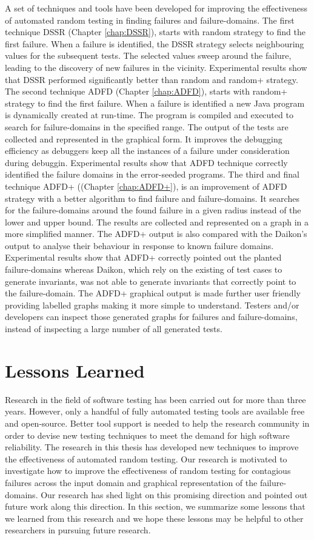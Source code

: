 A set of techniques and tools have been developed for improving the effectiveness of automated random testing in finding failures and failure-domains. The first technique DSSR (Chapter \ref{chap:DSSR}), starts with random strategy to find the first failure. When a failure is identified, the DSSR strategy selects neighbouring values for the subsequent tests. The selected values sweep around the failure, leading to the discovery of new failures in the vicinity. Experimental results show that DSSR performed significantly better than random and random+ strategy. The second technique ADFD (Chapter \ref{chap:ADFD}), starts with random+ strategy to find the first failure. When a failure is identified a new Java program is dynamically created at run-time. The program is compiled and executed to search for failure-domains in the specified range. The output of the tests are collected and represented in the graphical form. It improves the debugging efficiency as debuggers keep all the instances of a failure under consideration during debuggin. Experimental results show that ADFD technique correctly identified the failure domains in the error-seeded programs. The third and final technique ADFD+ ((Chapter \ref{chap:ADFD+}), is an improvement of ADFD strategy with a better algorithm to find failure and failure-domains. It searches for the failure-domains around the found failure in a given radius instead of the lower and upper bound. The results are collected and  represented on a graph in a more simplified manner. The ADFD+ output is also compared with the Daikon's output to analyse their behaviour in response to known failure domains. Experimental results show that ADFD+ correctly pointed out the planted failure-domains whereas Daikon, which rely on the existing of test cases to generate invariants, was not able to generate invariants that correctly point to the failure-domain. The ADFD+ graphical output is made further user friendly providing labelled graphs making it more simple to understand. Testers and/or developers can inspect those generated graphs for failures and failure-domains, instead of inspecting a large number of all generated tests. 

\section{Lessons Learned}
Research in the field of software testing has been carried out for more than three years. However, only a handful of fully automated testing tools are available free and open-source. Better tool support is needed to help the research community in order to devise new testing techniques to meet the demand for high software reliability. The research in this thesis has developed new techniques to improve the effectiveness of automated random testing. Our research is motivated to investigate how to improve the effectiveness of random testing for contagious failures across the input domain and graphical representation of the failure-domains. Our research has shed light on this promising direction and pointed out future work along this direction. In this section, we summarize some lessons that we learned from this research and we hope these lessons may be helpful to other researchers in pursuing future research.

